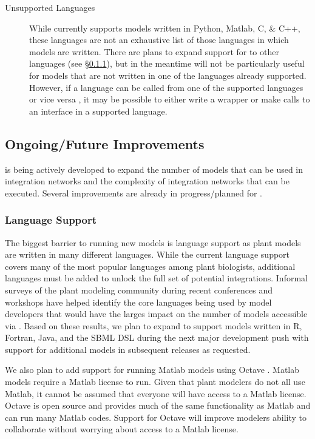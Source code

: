 \documentclass[journal]{IEEEtran}
\newcommand{\todo}[1]{{\color{red}{#1}}}
\newcommand{\pkg}{{\tt \todo{cis\_interface}}{}}
\begin{document}
\begin{description}
	\item[Unsupported Languages] While {\pkg} currently supports models written in Python, Matlab, C, \& C++, these languages are not an exhaustive list of those languages in which models are written. There are plans to expand support for {\pkg} to other languages (see \S\ref{SS:langsupport}), but in the meantime {\pkg} will not be particularly useful for models that are not written in one of the languages already supported. However, if a language can be called from one of the supported languages or vice versa \citep[e.g. f2py or SWIG,][]{Peterson2009,Beazley2003}, it may be possible to either write a wrapper or make calls to an interface in a supported language.
\end{description}

\subsection{Ongoing/Future Improvements}\label{SS:future}
%
{\pkg} is being actively developed to expand the number of models that can be used in integration networks and the complexity of integration networks that can be executed. Several improvements are already in progress/planned for {\pkg}.

\subsubsection{Language Support}\label{SS:langsupport}
%
The biggest barrier to running new models is language support as plant models are written in many different languages. While the current language support covers many of the most popular languages among plant biologists, additional languages must be added to unlock the full set of potential integrations. Informal surveys of the plant modeling community during recent conferences and workshops have helped identify the core languages being used by model developers that would have the larges impact on the number of models accessible via {\pkg}. Based on these results, we plan to expand {\pkg} to support models written in R, Fortran, Java, and the SBML \citep{Hucka2003} DSL during the next major development push with support for additional models in subsequent releases as requested.

We also plan to add support for running Matlab models using Octave \citep{Eaton2002}. Matlab models require a Matlab license to run. Given that plant modelers do not all use Matlab, it cannot be assumed that everyone will have access to a Matlab license. Octave is open source and provides much of the same functionality as Matlab and can run many Matlab codes. Support for Octave will improve modelers ability to collaborate without worrying about access to a Matlab license. 
\end{document}
